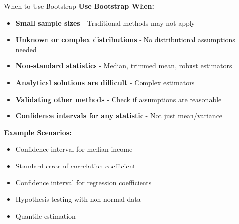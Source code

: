 \documentclass[aspectratio=169]{beamer}
\begin{document}
\begin{frame}{When to Use Bootstrap}
\footnotesize
\textbf{Use Bootstrap When:}
\begin{itemize}
    \item \textbf{Small sample sizes} - Traditional methods may not apply
    \item \textbf{Unknown or complex distributions} - No distributional assumptions needed
    \item \textbf{Non-standard statistics} - Median, trimmed mean, robust estimators
    \item \textbf{Analytical solutions are difficult} - Complex estimators
    \item \textbf{Validating other methods} - Check if assumptions are reasonable
    \item \textbf{Confidence intervals for any statistic} - Not just mean/variance
\end{itemize}

\vspace{0.2cm}
\textbf{Example Scenarios:}
\begin{itemize}
    \item Confidence interval for median income
    \item Standard error of correlation coefficient
    \item Confidence interval for regression coefficients
    \item Hypothesis testing with non-normal data
    \item Quantile estimation
\end{itemize}
\end{frame}
\end{document}
